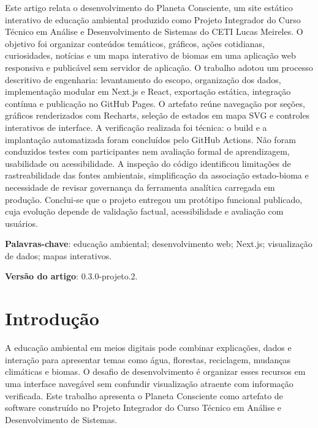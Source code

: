 \documentclass[12pt,oneside,a4paper,brazil]{abntex2}
\newcommand{\projectversion}{0.3.0-projeto.2}
\begin{document}
\begin{resumo}
Este artigo relata o desenvolvimento do Planeta Consciente, um site estático interativo de educação ambiental produzido como Projeto Integrador do Curso Técnico em Análise e Desenvolvimento de Sistemas do CETI Lucas Meireles. O objetivo foi organizar conteúdos temáticos, gráficos, ações cotidianas, curiosidades, notícias e um mapa interativo de biomas em uma aplicação web responsiva e publicável sem servidor de aplicação. O trabalho adotou um processo descritivo de engenharia: levantamento do escopo, organização dos dados, implementação modular em Next.js e React, exportação estática, integração contínua e publicação no GitHub Pages. O artefato reúne navegação por seções, gráficos renderizados com Recharts, seleção de estados em mapa SVG e controles interativos de interface. A verificação realizada foi técnica: o build e a implantação automatizada foram concluídos pelo GitHub Actions. Não foram conduzidos testes com participantes nem avaliação formal de aprendizagem, usabilidade ou acessibilidade. A inspeção do código identificou limitações de rastreabilidade das fontes ambientais, simplificação da associação estado-bioma e necessidade de revisar governança da ferramenta analítica carregada em produção. Conclui-se que o projeto entregou um protótipo funcional publicado, cuja evolução depende de validação factual, acessibilidade e avaliação com usuários.

\vspace{\onelineskip}
\noindent\textbf{Palavras-chave}: educação ambiental; desenvolvimento web; Next.js; visualização de dados; mapas interativos.
\end{resumo}

\noindent\textbf{Versão do artigo}: \projectversion.\\
\tableofcontents*
\textual
\chapter{Introdução}
A educação ambiental em meios digitais pode combinar explicações, dados e interação para apresentar temas como água, florestas, reciclagem, mudanças climáticas e biomas. O desafio de desenvolvimento é organizar esses recursos em uma interface navegável sem confundir visualização atraente com informação verificada. Este trabalho apresenta o Planeta Consciente como artefato de software construído no Projeto Integrador do Curso Técnico em Análise e Desenvolvimento de Sistemas.
\end{document}
